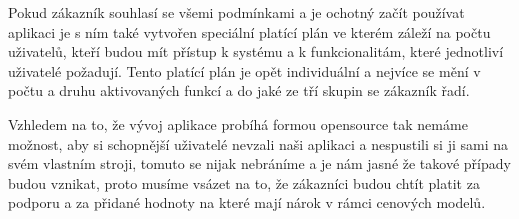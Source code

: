 \par Pokud zákazník souhlasí se všemi podmínkami a je ochotný začít používat aplikaci je s ním také vytvořen speciální platící plán ve kterém záleží na počtu uživatelů, kteří budou mít přístup k systému a k funkcionalitám, které jednotliví uživatelé požadují. Tento platící plán je opět individuální a nejvíce se mění v počtu a druhu aktivovaných funkcí a do jaké ze tří skupin se zákazník řadí.

\par Vzhledem na to, že vývoj aplikace probíhá formou opensource tak nemáme možnost, aby si schopnější uživatelé nevzali naši aplikaci a nespustili si ji sami na svém vlastním stroji, tomuto se nijak nebráníme a je nám jasné že takové případy budou vznikat, proto musíme vsázet na to, že zákazníci budou chtít platit za podporu a za přidané hodnoty na které mají nárok v rámci cenových modelů.
